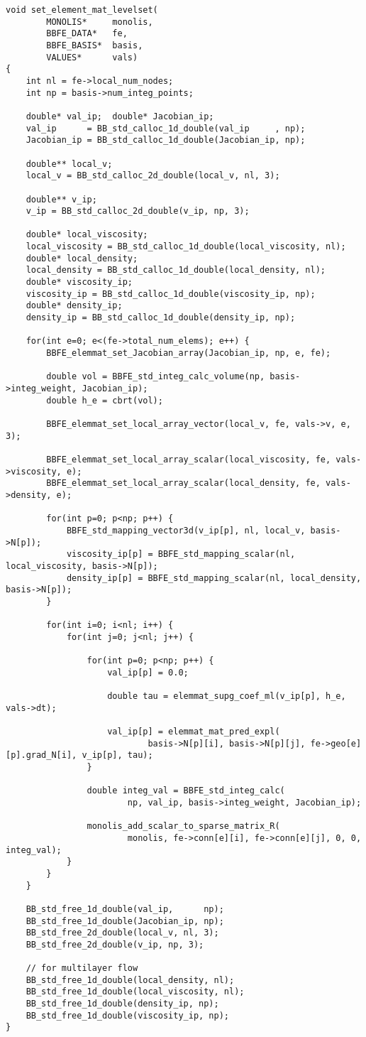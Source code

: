 \begin{lstlisting}[caption = mlflow\_fs.cの中のレベルセット関数の係数行列を計算する関数]
void set_element_mat_levelset(
		MONOLIS*     monolis,
		BBFE_DATA*   fe,
		BBFE_BASIS*  basis,
		VALUES*      vals)
{
	int nl = fe->local_num_nodes;
	int np = basis->num_integ_points;

	double* val_ip;  double* Jacobian_ip;
	val_ip      = BB_std_calloc_1d_double(val_ip     , np);
	Jacobian_ip = BB_std_calloc_1d_double(Jacobian_ip, np);

	double** local_v;
	local_v = BB_std_calloc_2d_double(local_v, nl, 3);

	double** v_ip; 
	v_ip = BB_std_calloc_2d_double(v_ip, np, 3);

	double* local_viscosity;
	local_viscosity = BB_std_calloc_1d_double(local_viscosity, nl);
	double* local_density;
	local_density = BB_std_calloc_1d_double(local_density, nl);
	double* viscosity_ip;
	viscosity_ip = BB_std_calloc_1d_double(viscosity_ip, np);
	double* density_ip;
	density_ip = BB_std_calloc_1d_double(density_ip, np);

	for(int e=0; e<(fe->total_num_elems); e++) {
		BBFE_elemmat_set_Jacobian_array(Jacobian_ip, np, e, fe);

		double vol = BBFE_std_integ_calc_volume(np, basis->integ_weight, Jacobian_ip);
		double h_e = cbrt(vol);

		BBFE_elemmat_set_local_array_vector(local_v, fe, vals->v, e, 3);

		BBFE_elemmat_set_local_array_scalar(local_viscosity, fe, vals->viscosity, e);
		BBFE_elemmat_set_local_array_scalar(local_density, fe, vals->density, e);

		for(int p=0; p<np; p++) {
			BBFE_std_mapping_vector3d(v_ip[p], nl, local_v, basis->N[p]);
			viscosity_ip[p] = BBFE_std_mapping_scalar(nl, local_viscosity, basis->N[p]);
			density_ip[p] = BBFE_std_mapping_scalar(nl, local_density, basis->N[p]);
		}

		for(int i=0; i<nl; i++) {
			for(int j=0; j<nl; j++) {

				for(int p=0; p<np; p++) {
					val_ip[p] = 0.0;

					double tau = elemmat_supg_coef_ml(v_ip[p], h_e, vals->dt);

					val_ip[p] = elemmat_mat_pred_expl(
							basis->N[p][i], basis->N[p][j], fe->geo[e][p].grad_N[i], v_ip[p], tau);
				}

				double integ_val = BBFE_std_integ_calc(
						np, val_ip, basis->integ_weight, Jacobian_ip);

				monolis_add_scalar_to_sparse_matrix_R(
						monolis, fe->conn[e][i], fe->conn[e][j], 0, 0, integ_val);
			}
		}
	}

	BB_std_free_1d_double(val_ip,      np);
	BB_std_free_1d_double(Jacobian_ip, np);
	BB_std_free_2d_double(local_v, nl, 3);
	BB_std_free_2d_double(v_ip, np, 3);

	// for multilayer flow
	BB_std_free_1d_double(local_density, nl);
	BB_std_free_1d_double(local_viscosity, nl);
	BB_std_free_1d_double(density_ip, np);
	BB_std_free_1d_double(viscosity_ip, np);
}
\end{lstlisting}

